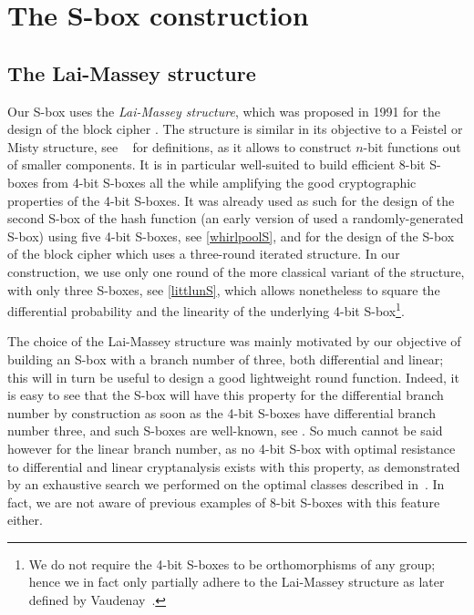 \section{The \littlun S-box construction}
\label{sec:litt}


\subsection{The Lai-Massey structure}
Our S-box uses the \emph{Lai-Massey structure}, which was proposed in 1991 for the design
of the block cipher \idea \cite{idea}. The structure is similar in its objective to a Feistel or Misty structure,
see \eg{}~\cite{sac15} for definitions,
as it allows to construct $n$-bit functions out of smaller components. It is in particular well-suited
to build efficient 8-bit S-boxes from 4-bit S-boxes all the while amplifying the good cryptographic
properties of the 4-bit S-boxes.
It was already used as such for the design of the second S-box of the \whirlpool hash function
\cite{whirlpool} (an early version of \whirlpool used a randomly-generated S-box) using five
4-bit S-boxes, see \autoref{whirlpoolS},
and for the design of the S-box of the \fox block cipher \cite{fox} which uses a three-round iterated structure.
In our construction, we use only one round of the more classical variant of the structure, with only three S-boxes,
see \autoref{littlunS}, which allows nonetheless to square the differential probability
and the linearity of the underlying 4-bit S-box\footnote{We do not require the 4-bit S-boxes to
be orthomorphisms of any group; hence we in fact only partially adhere to the Lai-Massey structure as later defined
by Vaudenay~\cite{vaudmassey}.}.

The choice of the Lai-Massey structure was mainly motivated by our objective of building
an S-box with a branch number of three, both differential and linear; this will in turn be useful to design a good lightweight round function.
Indeed, it is easy to see that the S-box will
have this property for the differential branch number by construction as soon as the 4-bit S-boxes have differential branch number three,
and such S-boxes are well-known, see \eg \serpent \cite{serpent}. So much cannot be said however for
the linear branch number, as no 4-bit S-box with optimal resistance to differential and linear cryptanalysis exists with this property, as
demonstrated by an exhaustive search we performed on the optimal classes described \eg{} in~\cite{class4bit}. In fact, we are not aware
of previous examples of 8-bit S-boxes with this feature either.

